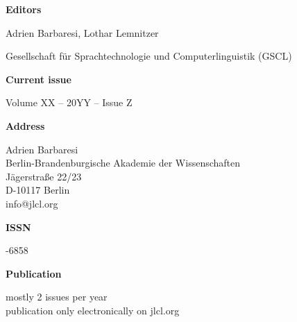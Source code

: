 \documentclass{jlcl}
\begin{document}
	

\vspace*{\fill}


\textbf{Editors}

\noindent 
Adrien Barbaresi, Lothar Lemnitzer

\noindent Gesellschaft für Sprachtechnologie und
Computerlinguistik (GSCL)

\bigskip

\textbf{Current issue}

\noindent Volume XX – 20YY – Issue Z

\bigskip




\textbf{Address}

\noindent Adrien Barbaresi\\
Berlin-Brandenburgische Akademie der
Wissenschaften\\
Jägerstraße 22/23\\
D-10117 Berlin\\
info@jlcl.org

\bigskip

\textbf{ISSN}

-6858

\bigskip

\textbf{Publication}

\noindent mostly 2 issues per year\\
publication only electronically on jlcl.org



\vspace*{\fill}
\end{document}
